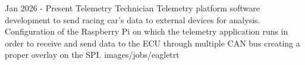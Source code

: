 {Jan 2026 - Present}
{Telemetry Technician}
{Telemetry platform software development 
to send racing car's data to external devices for analysis.
Conﬁguration of the Raspberry Pi on which the telemetry application
runs in order to receive and send data to the ECU through multiple 
CAN bus creating a proper overlay on the SPI.}
{images/jobs/eagletrt}
